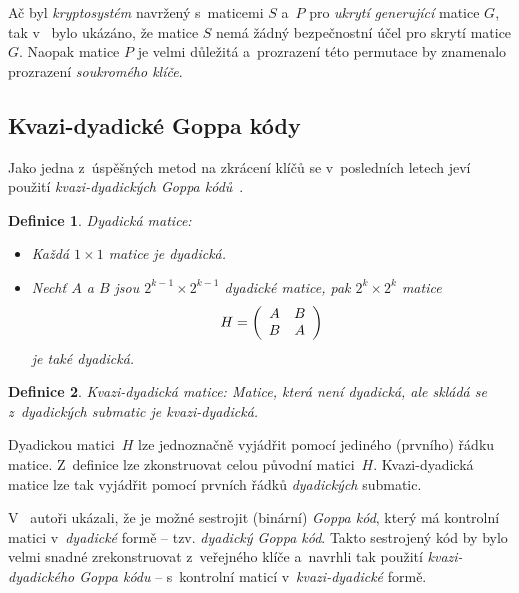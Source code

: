 \documentclass[thesis=M,czech,hidelinks]{FITthesis}[2012/06/26]
\newcommand{\0}{{\textcolor[gray]{0.75}{0}}}
\newtheorem{definice}{Definice}
\begin{document}
Ač byl \emph{kryptosystém} navržený s~maticemi $S$ a~$P$ pro \emph{ukrytí}
\emph{generující} matice $G$, tak v~\cite{Engelbert} bylo ukázáno, že matice $S$
nemá žádný bezpečnostní účel pro skrytí matice $G$. Naopak matice $P$ je velmi
důležitá a~prozrazení této permutace by znamenalo prozrazení \emph{soukromého
klíče}.


\subsection{Kvazi-dyadické Goppa kódy}\label{kap_kvazi}

Jako jedna z~úspěšných metod na zkrácení klíčů se v~posledních letech jeví
použití \emph{kvazi-dyadických Goppa kódů}~\cite{Misoczki1}.

\begin{definice}{Dyadická matice:}
    \begin{itemize}
        \item Každá $1\times1$ matice je \emph{dyadická}.

        \item Nechť $A$ a $B$ jsou $2^{k-1}\times2^{k-1}$ \emph{dyadické}
            matice, pak
            $2^k\times2^k$ matice
            $$
                H = \left(\begin{array}{c c}
                    A & B\\
                    B & A
                \end{array}\right)
            $$
            je také \emph{dyadická}.

    \end{itemize}
\end{definice}


\begin{definice}{Kvazi-dyadická matice:}
    Matice, která není \emph{dyadická}, ale skládá se z~\emph{dyadických}
    submatic je \emph{kvazi-dyadická}.
\end{definice}

Dyadickou matici~$H$ lze jednoznačně vyjádřit pomocí jediného (prvního) řádku
matice. Z~definice lze zkonstruovat celou původní matici~$H$. Kvazi-dyadická
matice lze tak vyjádřit pomocí prvních řádků \emph{dyadických} submatic.


V~\cite{Misoczki1} autoři ukázali, že je možné sestrojit (binární) \emph{Goppa
kód}, který má kontrolní matici v~\emph{dyadické} formě -- tzv. \emph{dyadický
Goppa kód}. Takto sestrojený kód by bylo velmi snadné zrekonstruovat z~veřejného
klíče a~navrhli tak použití \emph{kvazi-dyadického Goppa kódu} -- s~kontrolní
maticí v~\emph{kvazi-dyadické} formě.
\end{document}
